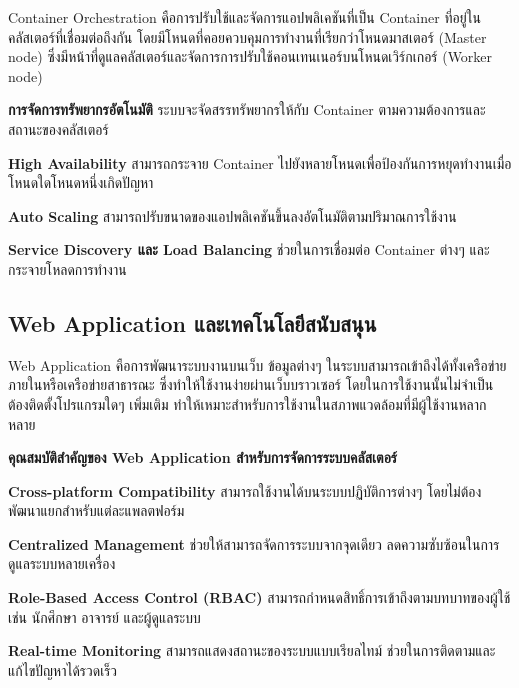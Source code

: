\hspace*{1.5em} %
Container Orchestration คือการปรับใช้และจัดการแอปพลิเคชันที่เป็น Container ที่อยู่ในคลัสเตอร์ที่เชื่อมต่อถึงกัน โดยมีโหนดที่คอยควบคุมการทำงานที่เรียกว่าโหนดมาสเตอร์ (Master node) ซึ่งมีหน้าที่ดูแลคลัสเตอร์และจัดการการปรับใช้คอนเทนเนอร์บนโหนดเวิร์กเกอร์ (Worker node)

\begin{mycustomitem}
    \item \textbf{การจัดการทรัพยากรอัตโนมัติ} ระบบจะจัดสรรทรัพยากรให้กับ Container ตามความต้องการและสถานะของคลัสเตอร์
    \item \textbf{High Availability} สามารถกระจาย Container ไปยังหลายโหนดเพื่อป้องกันการหยุดทำงานเมื่อโหนดใดโหนดหนึ่งเกิดปัญหา
    \item \textbf{Auto Scaling} สามารถปรับขนาดของแอปพลิเคชันขึ้นลงอัตโนมัติตามปริมาณการใช้งาน
    \item \textbf{Service Discovery และ Load Balancing} ช่วยในการเชื่อมต่อ Container ต่างๆ และกระจายโหลดการทำงาน
\end{mycustomitem}
\subsection{Web Application และเทคโนโลยีสนับสนุน}

\hspace*{1.5em} %
Web Application คือการพัฒนาระบบงานบนเว็บ ข้อมูลต่างๆ ในระบบสามารถเข้าถึงได้ทั้งเครือข่ายภายในหรือเครือข่ายสาธารณะ ซึ่งทำให้ใช้งานง่ายผ่านเว็บบราวเซอร์ โดยในการใช้งานนั้นไม่จำเป็นต้องติดตั้งโปรแกรมใดๆ เพิ่มเติม ทำให้เหมาะสำหรับการใช้งานในสภาพแวดล้อมที่มีผู้ใช้งานหลากหลาย

\hspace*{1.5em} %
\textbf{คุณสมบัติสำคัญของ Web Application สำหรับการจัดการระบบคลัสเตอร์}
\begin{mycustomitem}
    \item \textbf{Cross-platform Compatibility} สามารถใช้งานได้บนระบบปฏิบัติการต่างๆ โดยไม่ต้องพัฒนาแยกสำหรับแต่ละแพลตฟอร์ม
    \item \textbf{Centralized Management} ช่วยให้สามารถจัดการระบบจากจุดเดียว ลดความซับซ้อนในการดูแลระบบหลายเครื่อง
    \item \textbf{Role-Based Access Control (RBAC)} สามารถกำหนดสิทธิ์การเข้าถึงตามบทบาทของผู้ใช้ เช่น นักศึกษา อาจารย์ และผู้ดูแลระบบ
    \item \textbf{Real-time Monitoring} สามารถแสดงสถานะของระบบแบบเรียลไทม์ ช่วยในการติดตามและแก้ไขปัญหาได้รวดเร็ว
\end{mycustomitem}


